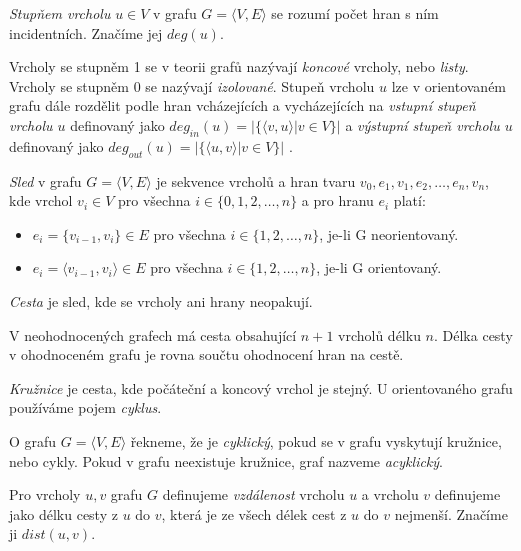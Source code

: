 \documentclass[
  program=infoi,
  biblatex=true,
  sourcecodes=true,
  figures=true,
  glossaries=false,
  index
]{kidiplom}
\begin{document}
\begin{definition}
\textit{Stupňem vrcholu} $u \in V$ v grafu $G = \langle V,E\rangle$ se rozumí počet hran s ním incidentních. Značíme jej $ deg(u) $.
\end{definition}

Vrcholy se stupněm 1 se v teorii grafů nazývají \textit{koncové} vrcholy, nebo \textit{listy}. Vrcholy se stupněm 0 se nazývají \textit{izolované}. Stupeň vrcholu $u$ lze v orientovaném grafu dále rozdělit podle hran vcházejících a vycházejících na \textit{vstupní stupeň vrcholu $u$} definovaný jako $ deg_{in}(u) = | \{ \langle v, u \rangle | v \in V \} | $ a \textit{výstupní stupeň vrcholu $u$} definovaný jako $ deg_{out}(u) = | \{ \langle u, v \rangle | v \in V \} | $ .

\begin{definition}[Sled]
\textit{Sled} v grafu $G = \langle V,E\rangle$ je sekvence vrcholů a hran tvaru $ v_0, e_1, v_1, e_2, \ldots  ,e_n , v_n $, kde vrchol $ v_i \in V $ pro všechna $ i \in \{ 0, 1, 2, \ldots ,n \} $ a pro hranu $ e_i $ platí:
\begin{itemize}
	\item $ e_i = \{ v_{i-1}, v_i \} \in E$ pro všechna $ i \in \{ 1, 2, \ldots ,n \} $, je-li G neorientovaný.
	\item $ e_i = \langle v_{i-1}, v_i \rangle \in E$ pro všechna $ i \in \{ 1, 2, \ldots ,n \} $, je-li G orientovaný.
\end{itemize}
\end{definition}

\begin{definition}[Cesta]
\textit{Cesta} je sled, kde se vrcholy ani hrany neopakují.
\end{definition}

V neohodnocených grafech má cesta obsahující $n+1$ vrcholů délku $n$. Délka cesty v ohodnoceném grafu je rovna součtu ohodnocení hran na cestě.

\begin{definition}[Kružnice]
\textit{Kružnice} je cesta, kde počáteční a koncový vrchol je stejný. U orientovaného grafu používáme pojem \textit{cyklus}.
\end{definition}

O grafu $G = \langle V,E\rangle$ řekneme, že je \textit{cyklický}, pokud se v grafu vyskytují kružnice, nebo cykly. Pokud v grafu neexistuje kružnice, graf nazveme \textit{acyklický}.

\begin{definition}[Vzdálenost]
Pro vrcholy $u,v$ grafu $G$ definujeme \textit{vzdálenost} vrcholu $u$ a vrcholu $v$ definujeme jako délku cesty z $u$ do $v$, která je ze všech délek cest z $u$ do $v$ nejmenší. Značíme ji $dist(u,v)$.
\end{definition}
\end{document}
